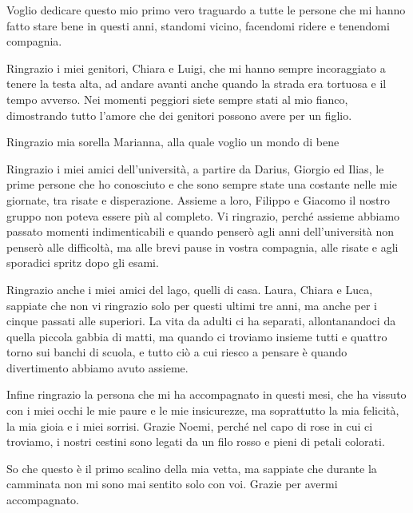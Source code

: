 \newenvironment{dedication}
    {
    \clearpage %
    \thispagestyle{empty} %
    \vspace*{\stretch{1}} %
    \begin{center}\begin{em}}
    {\end{em}\end{center}
    \vspace*{\stretch{2}} %
    \clearpage %
    }



\begin{dedication}
  Voglio dedicare questo mio primo vero traguardo a tutte le persone che mi hanno fatto stare bene in questi anni, standomi vicino, facendomi ridere e tenendomi compagnia. 

  Ringrazio i miei genitori, Chiara e Luigi, che mi hanno sempre incoraggiato a tenere la testa alta, ad andare avanti anche quando la strada era tortuosa e il tempo avverso. Nei momenti peggiori siete sempre stati al mio fianco, dimostrando tutto l'amore che dei genitori possono avere per un figlio. 

  Ringrazio mia sorella Marianna, alla quale voglio un mondo di bene 





  Ringrazio i miei amici dell'università, a partire da Darius, Giorgio ed Ilias, le prime persone che ho conosciuto e che sono sempre state una costante nelle mie giornate, tra risate e disperazione. Assieme a loro, Filippo e Giacomo il nostro gruppo non poteva essere più al completo. Vi ringrazio, perché assieme abbiamo passato momenti indimenticabili e quando penserò agli anni dell'università non penserò alle difficoltà, ma alle brevi pause in vostra compagnia, alle risate e agli sporadici spritz dopo gli esami.

  Ringrazio anche i miei amici del lago, quelli di casa. Laura, Chiara e Luca, sappiate che non vi ringrazio solo per questi ultimi tre anni, ma anche per i cinque passati alle superiori. La vita da adulti ci ha separati, allontanandoci da quella piccola gabbia di matti, ma quando ci troviamo insieme tutti e quattro torno sui banchi di scuola, e tutto ciò a cui riesco a pensare è quando divertimento abbiamo avuto assieme.
  
  
  Infine ringrazio la persona che mi ha accompagnato in questi mesi, che ha vissuto con i miei occhi le mie paure e le mie insicurezze, ma soprattutto la mia felicità, la mia gioia e i miei sorrisi. Grazie Noemi, perché nel capo di rose in cui ci troviamo, i nostri cestini sono legati da un filo rosso e pieni di petali colorati.
  
  
  So che questo è il primo scalino della mia vetta, ma sappiate che durante la camminata non mi sono mai sentito solo con voi. Grazie per avermi accompagnato. 
\end{dedication}